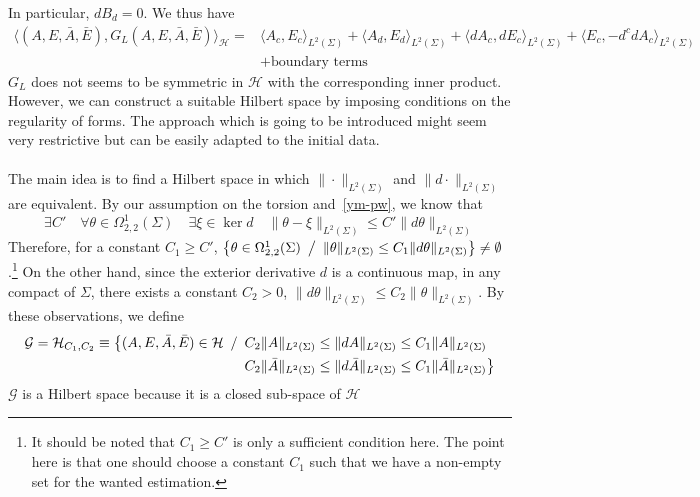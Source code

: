 In particular, $d B_d = 0$. 
We thus have 
\begin{equation*}
\begin{split}
\langle (A,E,\bar{A},\bar{E}), G_L(A,E,\bar{A},\bar{E}) \rangle_{\mathcal{H}} = &
\langle A_c, E_c \rangle_{L^2(\Sigma)} + \langle A_d, E_d \rangle_{L^2(\Sigma)}
+ \langle d A_c, d E_c \rangle_{L^2(\Sigma)}
+ \langle E_c, -d^c d A_c\rangle_{L^2(\Sigma)} \\
& + \textrm{boundary terms}
\end{split}
\end{equation*}
$G_L$ does not seems to be symmetric in $\mathcal{H}$ with the corresponding inner product. 
However, we can construct a suitable Hilbert space by imposing conditions on the regularity of forms. 
The approach which is going to be introduced might seem very restrictive but can be easily adapted to the initial data.\\\\
The main idea is to find a Hilbert space in which $\| \cdot \|_{L^2(\Sigma)}$ and $\| d \cdot \|_{L^2(\Sigma)}$ are equivalent. 
By our assumption on the torsion and~\cref{ym-pw}, we know that
\begin{equation*}
\exists C' \quad
\forall \theta \in \Omega^1_{2,2}(\Sigma) \quad
\exists\xi\in\ker d\quad
\| \theta - \xi \|_{L^2(\Sigma)}\leq C' \| d \theta \|_{L^2(\Sigma)}
\end{equation*}
Therefore, for a constant $C_1 \geq C'$, $\big\{\theta\in\Omega^1_{2,2}(\Sigma) \enskip \big/\enskip \|\theta \|_{L^2(\Sigma)} \leq C_1\|d \theta \|_{L^2(\Sigma)} \big\} \neq \emptyset$.\footnote{ 
It should be noted that $C_1 \geq C'$ is only a sufficient condition here. 
The point here is that one should choose a constant $C_1$ such that we have a non-empty set for the wanted estimation.
}
On the other hand, since the exterior derivative $d$ is a continuous map, in any compact of $\Sigma$, there exists a constant $C_2 >0$, $\| d \theta \|_{L^2(\Sigma)} \leq C_2 \| \theta \|_{L^2(\Sigma)}$. 
By these observations, we define 
\begin{equation*}
\begin{split}
\mathcal{G} = \mathcal{H}_{C_1, C_2} \equiv\big\{ (A,E,\bar{A},\bar{E}) \in \mathcal{H} \enskip/\enskip &
C_2 \|A\|_{L^2(\Sigma)} \leq \| d A \|_{L^2(\Sigma)} \leq C_1\| A\|_{L^2({\Sigma})} \\
& C_2 \|\bar{A}\|_{L^2(\Sigma)} \leq \| d \bar{A} \|_{L^2(\Sigma)} \leq C_1\| \bar{A}\|_{L^2({\Sigma})} \big\}
\end{split}
\end{equation*}
$\mathcal{G}$ is a Hilbert space because it is a closed sub-space of $\mathcal{H}$ 











